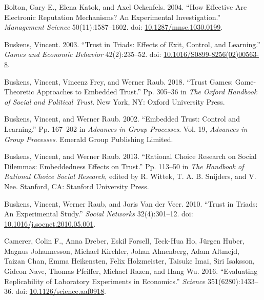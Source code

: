 \documentclass[
  11pt,
]{article}
\newlength{\cslhangindent}
\newlength{\cslentryspacingunit} %
\newenvironment{CSLReferences}[2] %
 {%
  \setlength{\parindent}{0pt}
  \ifodd #1
  \let\oldpar\par
  \def\par{\hangindent=\cslhangindent\oldpar}
  \fi
  \setlength{\parskip}{#2\cslentryspacingunit}
 }%
 {}
\begin{document}
\begin{CSLReferences}{1}{0}
\leavevmode{}%
Bolton, Gary E., Elena Katok, and Axel Ockenfels. 2004. {``How Effective Are Electronic Reputation Mechanisms? An Experimental Investigation.''} \emph{Management Science} 50(11):1587--1602. doi: \href{https://doi.org/10.1287/mnsc.1030.0199}{10.1287/mnsc.1030.0199}.

\leavevmode{}%
Buskens, Vincent. 2003. {``Trust in Triads: Effects of Exit, Control, and Learning.''} \emph{Games and Economic Behavior} 42(2):235--52. doi: \href{https://doi.org/10.1016/S0899-8256(02)00563-8}{10.1016/S0899-8256(02)00563-8}.

\leavevmode{}%
Buskens, Vincent, Vincenz Frey, and Werner Raub. 2018. {``Trust Games: Game-Theoretic Approaches to Embedded Trust.''} Pp. 305--36 in \emph{The {O}xford {H}andbook of {S}ocial and {P}olitical {T}rust}. New York, NY: Oxford University Press.

\leavevmode{}%
Buskens, Vincent, and Werner Raub. 2002. {``Embedded Trust: {Control} and Learning.''} Pp. 167--202 in \emph{Advances in {Group} {Processes}}. Vol. 19, \emph{Advances in {Group} {Processes}}. Emerald Group Publishing Limited.

\leavevmode{}%
Buskens, Vincent, and Werner Raub. 2013. {``Rational Choice Research on Social Dilemmas: Embeddedness Effects on Trust.''} Pp. 113--50 in \emph{The {H}andbook of {R}ational {C}hoice {S}ocial {R}esearch}, edited by R. Wittek, T. A. B. Snijders, and V. Nee. Stanford, CA: Stanford University Press.

\leavevmode{}%
Buskens, Vincent, Werner Raub, and Joris Van der Veer. 2010. {``Trust in Triads: An Experimental Study.''} \emph{Social Networks} 32(4):301--12. doi: \href{https://doi.org/10.1016/j.socnet.2010.05.001}{10.1016/j.socnet.2010.05.001}.

\leavevmode{}%
Camerer, Colin F., Anna Dreber, Eskil Forsell, Teck-Hua Ho, Jürgen Huber, Magnus Johannesson, Michael Kirchler, Johan Almenberg, Adam Altmejd, Taizan Chan, Emma Heikensten, Felix Holzmeister, Taisuke Imai, Siri Isaksson, Gideon Nave, Thomas Pfeiffer, Michael Razen, and Hang Wu. 2016. {``Evaluating Replicability of Laboratory Experiments in Economics.''} \emph{Science} 351(6280):1433--36. doi: \href{https://doi.org/10.1126/science.aaf0918}{10.1126/science.aaf0918}.


\end{CSLReferences}
\end{document}

